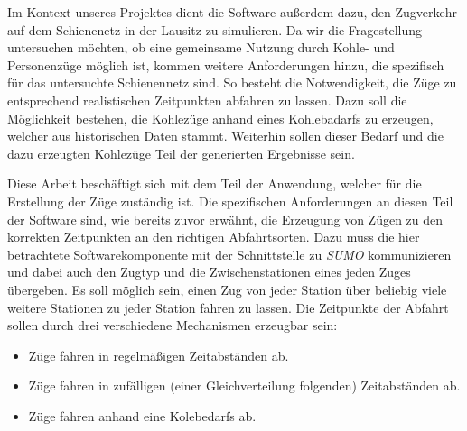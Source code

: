 Im Kontext unseres Projektes dient die Software außerdem dazu, den Zugverkehr auf dem Schienenetz in der Lausitz zu simulieren. Da wir die Fragestellung untersuchen möchten, ob eine gemeinsame Nutzung durch Kohle- und Personenzüge möglich ist, kommen weitere Anforderungen hinzu, die spezifisch für das untersuchte Schienennetz sind. So besteht die Notwendigkeit, die Züge zu entsprechend realistischen Zeitpunkten abfahren zu lassen. Dazu soll die Möglichkeit bestehen, die Kohlezüge anhand eines Kohlebadarfs zu erzeugen, welcher aus historischen Daten stammt. Weiterhin sollen dieser Bedarf und die dazu erzeugten Kohlezüge Teil der generierten Ergebnisse sein.

Diese Arbeit beschäftigt sich mit dem Teil der Anwendung, welcher für die Erstellung der Züge zuständig ist. Die spezifischen Anforderungen an diesen Teil der Software sind, wie bereits zuvor erwähnt, die Erzeugung von Zügen zu den korrekten Zeitpunkten an den richtigen Abfahrtsorten. Dazu muss die hier betrachtete Softwarekomponente mit der Schnittstelle zu \emph{SUMO} kommunizieren und dabei auch den Zugtyp und die Zwischenstationen eines jeden Zuges übergeben. Es soll möglich sein, einen Zug von jeder Station über beliebig viele weitere Stationen zu jeder Station fahren zu lassen. Die Zeitpunkte der Abfahrt sollen durch drei verschiedene Mechanismen erzeugbar sein:
\begin{itemize}
    \item Züge fahren in regelmäßigen Zeitabständen ab.
    \item Züge fahren in zufälligen (einer Gleichverteilung folgenden) Zeitabständen ab.
    \item Züge fahren anhand eine Kolebedarfs ab.
\end{itemize}

